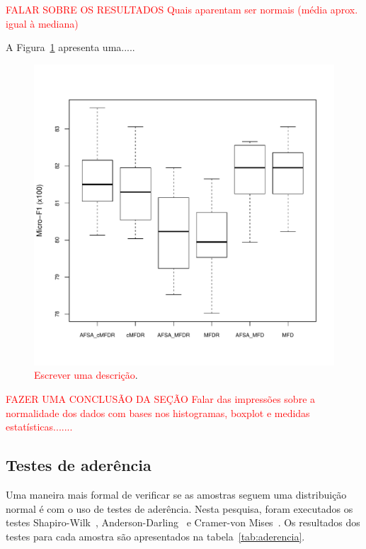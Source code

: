 \documentclass[conference]{IEEEtran}
\begin{document}
\textcolor{red}{FALAR SOBRE OS RESULTADOS
Quais aparentam ser normais (média aprox. igual à mediana)
}


A Figura~\ref{fig:boxplot} apresenta uma.....

\begin{figure}[h]
	\centering
	\includegraphics[width=\linewidth]{img/blueboxplot.pdf}
	\caption{\textcolor{red}{Escrever uma descrição}.}
	\label{fig:boxplot}
\end{figure}



\textcolor{red}{FAZER UMA CONCLUSÃO DA SEÇÃO
Falar das impressões sobre a normalidade dos dados com bases nos histogramas, boxplot e medidas estatísticas.......}

\subsection{Testes de aderência}

Uma maneira mais formal de verificar se as amostras seguem uma distribuição normal é com o uso de testes de aderência. Nesta pesquisa, foram executados os testes Shapiro-Wilk~\cite{shapiro1965analysis}, Anderson-Darling~\cite{anderson1954test} e Cramer-von Mises~\cite{durbin1972components}. Os resultados dos testes para cada amostra são apresentados na tabela~\ref{tab:aderencia}.
\end{document}
